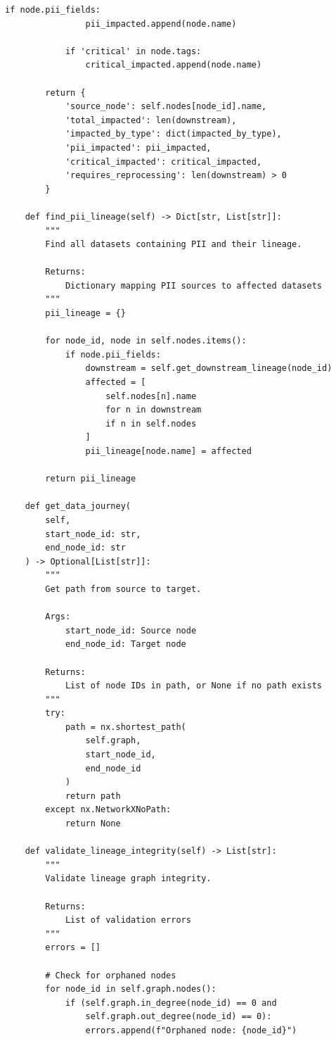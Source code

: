 \begin{lstlisting}[style=python, caption={Automated data lineage tracking system}]
            if node.pii_fields:
                pii_impacted.append(node.name)

            if 'critical' in node.tags:
                critical_impacted.append(node.name)

        return {
            'source_node': self.nodes[node_id].name,
            'total_impacted': len(downstream),
            'impacted_by_type': dict(impacted_by_type),
            'pii_impacted': pii_impacted,
            'critical_impacted': critical_impacted,
            'requires_reprocessing': len(downstream) > 0
        }

    def find_pii_lineage(self) -> Dict[str, List[str]]:
        """
        Find all datasets containing PII and their lineage.

        Returns:
            Dictionary mapping PII sources to affected datasets
        """
        pii_lineage = {}

        for node_id, node in self.nodes.items():
            if node.pii_fields:
                downstream = self.get_downstream_lineage(node_id)
                affected = [
                    self.nodes[n].name
                    for n in downstream
                    if n in self.nodes
                ]
                pii_lineage[node.name] = affected

        return pii_lineage

    def get_data_journey(
        self,
        start_node_id: str,
        end_node_id: str
    ) -> Optional[List[str]]:
        """
        Get path from source to target.

        Args:
            start_node_id: Source node
            end_node_id: Target node

        Returns:
            List of node IDs in path, or None if no path exists
        """
        try:
            path = nx.shortest_path(
                self.graph,
                start_node_id,
                end_node_id
            )
            return path
        except nx.NetworkXNoPath:
            return None

    def validate_lineage_integrity(self) -> List[str]:
        """
        Validate lineage graph integrity.

        Returns:
            List of validation errors
        """
        errors = []

        # Check for orphaned nodes
        for node_id in self.graph.nodes():
            if (self.graph.in_degree(node_id) == 0 and
                self.graph.out_degree(node_id) == 0):
                errors.append(f"Orphaned node: {node_id}")


\end{lstlisting}
